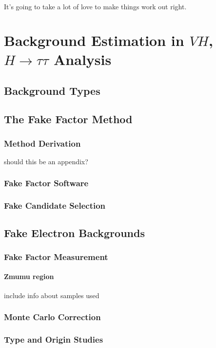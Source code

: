 \begin{savequote}[75mm]
It's going to take a lot of love to make things work out right.
\end{savequote}

\chapter{Background Estimation in $VH$, $H\rightarrow \tau\tau$ Analysis}

\section{Background Types}

\section{The Fake Factor Method}
\subsection{Method Derivation}
should this be an appendix?
\subsection{Fake Factor Software}
\subsection{Fake Candidate Selection}

\section{Fake Electron Backgrounds}
\subsection{Fake Factor Measurement}
\subsubsection{Zmumu region}
include info about samples used
\subsection{Monte Carlo Correction}
\subsection{Type and Origin Studies}
